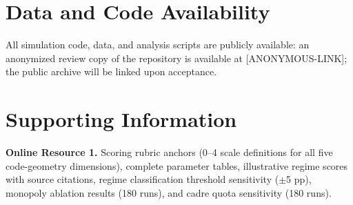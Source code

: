 \documentclass[12pt]{article}
\begin{document}
\section*{Data and Code Availability}

All simulation code, data, and analysis scripts are publicly available: an anonymized review copy of the repository is available at [ANONYMOUS-LINK]; the public archive will be linked upon acceptance.

\section*{Supporting Information}

\noindent\textbf{Online Resource 1.} Scoring rubric anchors (0--4 scale definitions for all five code-geometry dimensions), complete parameter tables, illustrative regime scores with source citations, regime classification threshold sensitivity ($\pm$5 pp), monopoly ablation results (180 runs), and cadre quota sensitivity (180 runs).
\end{document}
